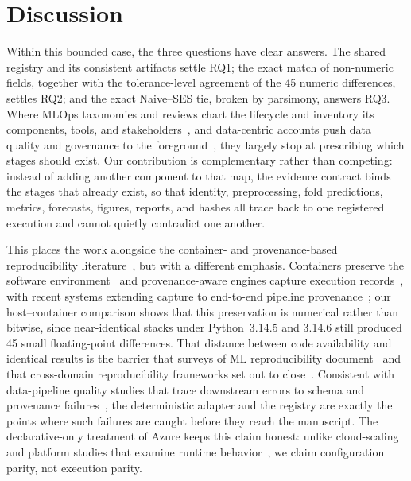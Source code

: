 \documentclass[runningheads]{llncs}
\begin{document}
    \section{Discussion}
        Within this bounded case, the three questions have clear answers. The shared registry and its consistent artifacts settle RQ1; the exact match of non-numeric fields, together with the tolerance-level agreement of the 45 numeric differences, settles RQ2; and the exact Naive--SES tie, broken by parsimony, answers RQ3. Where MLOps taxonomies and reviews chart the lifecycle and inventory its components, tools, and stakeholders~\cite{ref2,ref4,ref5,ref14}, and data-centric accounts push data quality and governance to the foreground~\cite{ref24}, they largely stop at prescribing which stages should exist. Our contribution is complementary rather than competing: instead of adding another component to that map, the evidence contract binds the stages that already exist, so that identity, preprocessing, fold predictions, metrics, forecasts, figures, reports, and hashes all trace back to one registered execution and cannot quietly contradict one another.

        This places the work alongside the container- and provenance-based reproducibility literature~\cite{ref7,ref8}, but with a different emphasis. Containers preserve the software environment~\cite{ref7} and provenance-aware engines capture execution records~\cite{ref8}, with recent systems extending capture to end-to-end pipeline provenance~\cite{ref21}; our host--container comparison shows that this preservation is numerical rather than bitwise, since near-identical stacks under Python~3.14.5 and 3.14.6 still produced 45 small floating-point differences. That distance between code availability and identical results is the barrier that surveys of ML reproducibility document~\cite{ref22} and that cross-domain reproducibility frameworks set out to close~\cite{ref25}. Consistent with data-pipeline quality studies that trace downstream errors to schema and provenance failures~\cite{ref6}, the deterministic adapter and the registry are exactly the points where such failures are caught before they reach the manuscript. The declarative-only treatment of Azure keeps this claim honest: unlike cloud-scaling and platform studies that examine runtime behavior~\cite{ref11,ref12}, we claim configuration parity, not execution parity.
\end{document}
